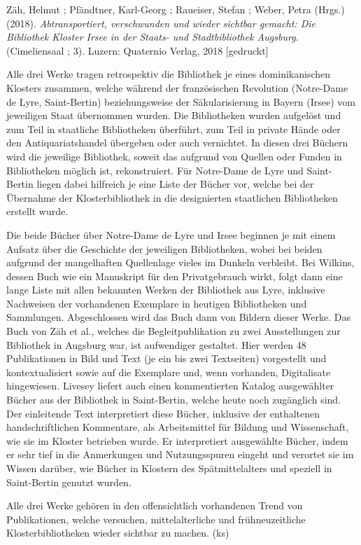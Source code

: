 \documentclass[a4paper,
fontsize=11pt,
oneside,
numbers=noperiodatend,
parskip=half-,
bibliography=totoc,
final
]{scrartcl}
\begin{document}
Zäh, Helmut ; Pfändtner, Karl-Georg ; Raueiser, Stefan ; Weber, Petra
(Hrgs.) (2018). \emph{Abtransportiert, verschwunden und wieder sichtbar
gemacht: Die Bibliothek Kloster Irsee in der Staats- und Stadtbibliothek
Augsburg.} (Cimeliensaal ; 3). Luzern: Quaternio Verlag, 2018
{[}gedruckt{]}

Alle drei Werke tragen retrospektiv die Bibliothek je eines
dominikanischen Klosters zusammen, welche während der französischen
Revolution (Notre-Dame de Lyre, Saint-Bertin) beziehungsweise der
Säkularisierung in Bayern (Irsee) vom jeweiligen Staat übernommen
wurden. Die Bibliotheken wurden aufgelöst und zum Teil in staatliche
Bibliotheken überführt, zum Teil in private Hände oder den
Antiquariatshandel übergeben oder auch vernichtet. In diesen drei
Büchern wird die jeweilige Bibliothek, soweit das aufgrund von Quellen
oder Funden in Bibliotheken möglich ist, rekonstruiert. Für Notre-Dame
de Lyre und Saint-Bertin liegen dabei hilfreich je eine Liste der Bücher
vor, welche bei der Übernahme der Klosterbibliothek in die designierten
staatlichen Bibliotheken erstellt wurde.

Die beide Bücher über Notre-Dame de Lyre und Irsee beginnen je mit einem
Aufsatz über die Geschichte der jeweiligen Bibliotheken, wobei bei
beiden aufgrund der mangelhaften Quellenlage vieles im Dunkeln
verbleibt. Bei Wilkins, dessen Buch wie ein Manuskript für den
Privatgebrauch wirkt, folgt dann eine lange Liste mit allen bekannten
Werken der Bibliothek aus Lyre, inklusive Nachweisen der vorhandenen
Exemplare in heutigen Bibliotheken und Sammlungen. Abgeschlossen wird
das Buch dann von Bildern dieser Werke. Das Buch von Zäh et al., welches
die Begleitpublikation zu zwei Ausstellungen zur Bibliothek in Augsburg
war, ist aufwendiger gestaltet. Hier werden 48 Publikationen in Bild und
Text (je ein bis zwei Textseiten) vorgestellt und kontextualisiert sowie
auf die Exemplare und, wenn vorhanden, Digitalisate hingewiesen. Livesey
liefert auch einen kommentierten Katalog ausgewählter Bücher aus der
Bibliothek in Saint-Bertin, welche heute noch zugänglich sind. Der
einleitende Text interpretiert diese Bücher, inklusive der enthaltenen
handschriftlichen Kommentare, als Arbeitsmittel für Bildung und
Wissenschaft, wie sie im Kloster betrieben wurde. Er interpretiert
ausgewählte Bücher, indem er sehr tief in die Anmerkungen und
Nutzungsspuren eingeht und verortet sie im Wissen darüber, wie Bücher in
Klostern des Spätmittelalters und speziell in Saint-Bertin genutzt
wurden.

Alle drei Werke gehören in den offensichtlich vorhandenen Trend von
Publikationen, welche versuchen, mittelalterliche und frühneuzeitliche
Klosterbibliotheken wieder sichtbar zu machen. (ks)
\end{document}
